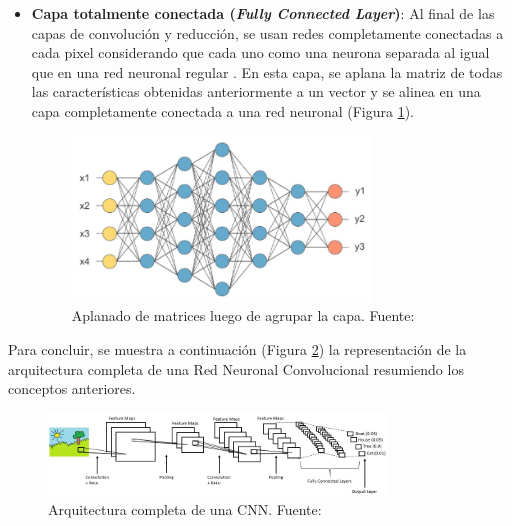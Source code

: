 \begin{itemize}
\begin{itemize}
\begin{itemize}
			\item \textbf{Capa totalmente conectada (\textit{Fully Connected Layer})}: Al final de las capas de convolución y reducción, se usan redes completamente conectadas a cada pixel considerando que cada uno como una neurona separada al igual que en una red neuronal regular \parencite{tec_lopez2016cnnTF}. En esta capa, se aplana la matriz de todas las características obtenidas anteriormente a un vector y se alinea en una capa completamente conectada a una red neuronal (Figura \ref{2:fig33}).
			\begin{figure}[h]
				\begin{center}
					\includegraphics[width=0.75\textwidth]{2/figures/fully_conected_cnn.jpg}
					\caption{Aplanado de matrices luego de agrupar la capa. Fuente: \cite{tec_prabhu2018cnn}}
					\label{2:fig33}
				\end{center}
			\end{figure}
		\end{itemize}
		Para concluir, se muestra a continuación (Figura \ref{2:fig34}) la representación de la arquitectura completa de una Red Neuronal Convolucional resumiendo los conceptos anteriores.
		\begin{figure}[h]
			\begin{center}
				\includegraphics[width=0.8\textwidth]{2/figures/arquitectura_cnn.jpg}
				\caption{Arquitectura completa de una CNN. Fuente: \cite{tec_prabhu2018cnn}}
				\label{2:fig34}
			\end{center}
		\end{figure}
		

\end{itemize}
\end{itemize}

